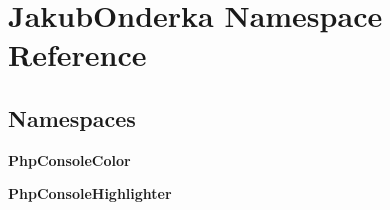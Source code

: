 \section{Jakub\+Onderka Namespace Reference}
\label{namespace_jakub_onderka}
\subsection*{Namespaces}
\begin{DoxyCompactItemize}
\item 
 {\bf Php\+Console\+Color}
\item 
 {\bf Php\+Console\+Highlighter}
\end{DoxyCompactItemize}
